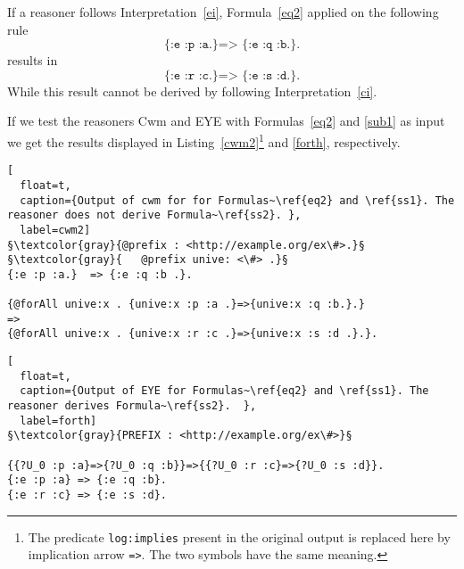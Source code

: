 If a reasoner follows Interpretation~\ref{ei}, Formula~\ref{eq2} applied on the following rule
\begin{equation}\label{ss1}
 \texttt{\{:e :p :a.\} => \{:e :q :b.\}.}
\end{equation}
results in
\begin{equation}\texttt{\{:e :r :c.\} => \{:e :s :d.\}.}\label{ss2}\end{equation}
While this result cannot be derived by following Interpretation~\ref{ci}. %


If we test the reasoners Cwm and EYE with Formulas~\ref{eq2} and \ref{sub1} as input we get the results displayed in Listing~\ref{cwm2}\footnote{The 
predicate \texttt{log:implies} present in the original output is replaced here by implication arrow \texttt{=>}. The two symbols have the same meaning.} and \ref{forth}, respectively.
\begin{lstlisting}[
  float=t,
  caption={Output of cwm for for Formulas~\ref{eq2} and \ref{ss1}. The reasoner does not derive Formula~\ref{ss2}. },
  label=cwm2]  
§\textcolor{gray}{@prefix : <http://example.org/ex\#>.}§
§\textcolor{gray}{   @prefix unive: <\#> .}§
{:e :p :a.}  => {:e :q :b .}.

{@forAll unive:x . {unive:x :p :a .}=>{unive:x :q :b.}.} 
=> 
{@forAll unive:x . {unive:x :r :c .}=>{unive:x :s :d .}.}.
\end{lstlisting}
\begin{lstlisting}[
  float=t,
  caption={Output of EYE for Formulas~\ref{eq2} and \ref{ss1}. The reasoner derives Formula~\ref{ss2}.  },
  label=forth]  
§\textcolor{gray}{PREFIX : <http://example.org/ex\#>}§

{{?U_0 :p :a}=>{?U_0 :q :b}}=>{{?U_0 :r :c}=>{?U_0 :s :d}}.
{:e :p :a} => {:e :q :b}.
{:e :r :c} => {:e :s :d}.
\end{lstlisting}
